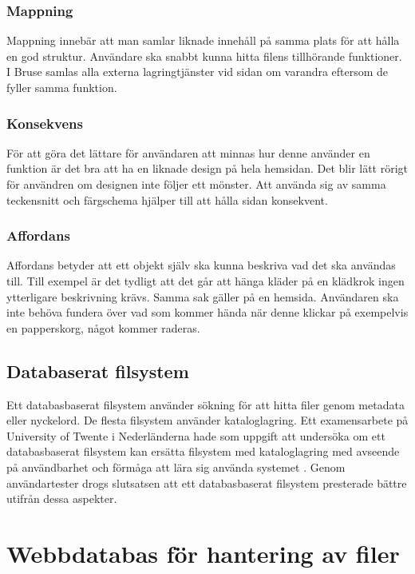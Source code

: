 \documentclass[a4paper,12pt,oneside,final]{extbook}
\begin{document}
\subsection{Mappning}
Mappning innebär att man samlar liknade innehåll på samma plats för att hålla en god struktur\cite{norman}. Användare ska snabbt kunna hitta filens tillhörande funktioner. I Bruse samlas alla externa lagringtjänster vid sidan om varandra eftersom de fyller samma funktion. 

\subsection{Konsekvens}
För att göra det lättare för användaren att minnas hur denne använder en funktion är det bra att ha en liknade design på hela hemsidan. Det blir lätt rörigt för användren om designen inte följer ett mönster. Att använda sig av samma teckensnitt och färgschema hjälper till att hålla sidan konsekvent\cite{norman}.

\subsection{Affordans}
Affordans betyder att ett objekt själv ska kunna beskriva vad det ska användas till. Till exempel är det tydligt att det går att hänga kläder på en klädkrok\cite{norman} ingen ytterligare beskrivning krävs. Samma sak gäller på en hemsida. Användaren ska inte behöva fundera över vad som kommer hända när denne klickar på exempelvis en papperskorg, något kommer raderas.

\section{Databaserat filsystem}
Ett databasbaserat filsystem använder sökning för att hitta filer genom metadata eller nyckelord. De flesta filsystem använder kataloglagring. Ett examensarbete på University of Twente i Nederländerna hade som uppgift att undersöka om ett databasbaserat filsystem kan ersätta filsystem med kataloglagring med avseende på användbarhet och förmåga att lära sig använda systemet \cite{twente}. Genom användartester drogs slutsatsen att ett databasbaserat filsystem presterade bättre utifrån dessa aspekter.

\chapter{Webbdatabas för hantering av filer}
\end{document}
